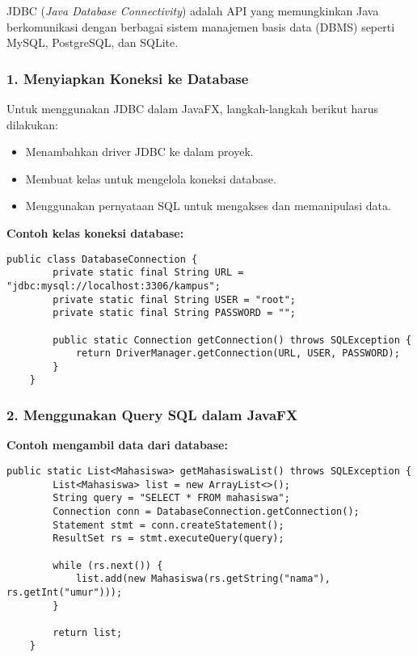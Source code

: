 JDBC (\textit{Java Database Connectivity}) adalah API yang memungkinkan Java berkomunikasi dengan berbagai sistem manajemen basis data (DBMS) seperti MySQL, PostgreSQL, dan SQLite.

\subsubsection{1. Menyiapkan Koneksi ke Database}

Untuk menggunakan JDBC dalam JavaFX, langkah-langkah berikut harus dilakukan:
\begin{itemize}
	\item Menambahkan driver JDBC ke dalam proyek.
	\item Membuat kelas untuk mengelola koneksi database.
	\item Menggunakan pernyataan SQL untuk mengakses dan memanipulasi data.
\end{itemize}

\textbf{Contoh kelas koneksi database:}
\begin{lstlisting}[style=JavaStyle, caption=Membuat koneksi ke database MySQL]
	public class DatabaseConnection {
		private static final String URL = "jdbc:mysql://localhost:3306/kampus";
		private static final String USER = "root";
		private static final String PASSWORD = "";
		
		public static Connection getConnection() throws SQLException {
			return DriverManager.getConnection(URL, USER, PASSWORD);
		}
	}
\end{lstlisting}

\subsubsection{2. Menggunakan Query SQL dalam JavaFX}

\textbf{Contoh mengambil data dari database:}
\begin{lstlisting}[style=JavaStyle, caption=Menjalankan Query SQL dalam JavaFX]
	public static List<Mahasiswa> getMahasiswaList() throws SQLException {
		List<Mahasiswa> list = new ArrayList<>();
		String query = "SELECT * FROM mahasiswa";
		Connection conn = DatabaseConnection.getConnection();
		Statement stmt = conn.createStatement();
		ResultSet rs = stmt.executeQuery(query);
		
		while (rs.next()) {
			list.add(new Mahasiswa(rs.getString("nama"), rs.getInt("umur")));
		}
		
		return list;
	}
\end{lstlisting}

